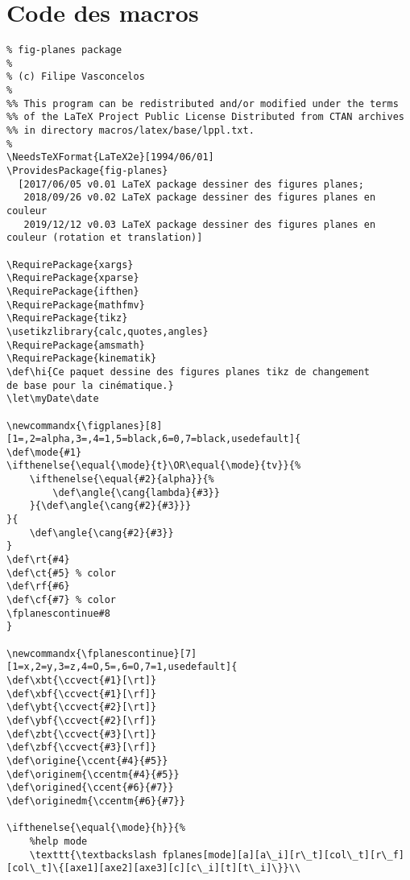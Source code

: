 \documentclass[a4paper,9pt]{article}
\begin{document}
\section{Code des macros}
\footnotesize
\begin{verbatim}
% fig-planes package
% 
% (c) Filipe Vasconcelos
%
%% This program can be redistributed and/or modified under the terms
%% of the LaTeX Project Public License Distributed from CTAN archives
%% in directory macros/latex/base/lppl.txt.
% 
\NeedsTeXFormat{LaTeX2e}[1994/06/01]
\ProvidesPackage{fig-planes}
  [2017/06/05 v0.01 LaTeX package dessiner des figures planes;
   2018/09/26 v0.02 LaTeX package dessiner des figures planes en couleur
   2019/12/12 v0.03 LaTeX package dessiner des figures planes en couleur (rotation et translation)]

\RequirePackage{xargs}
\RequirePackage{xparse}
\RequirePackage{ifthen}
\RequirePackage{mathfmv}
\RequirePackage{tikz}
\usetikzlibrary{calc,quotes,angles}
\RequirePackage{amsmath}
\RequirePackage{kinematik}
\def\hi{Ce paquet dessine des figures planes tikz de changement 
de base pour la cinématique.}
\let\myDate\date

\newcommandx{\figplanes}[8][1=,2=alpha,3=,4=1,5=black,6=0,7=black,usedefault]{ 
\def\mode{#1}
\ifthenelse{\equal{\mode}{t}\OR\equal{\mode}{tv}}{%
    \ifthenelse{\equal{#2}{alpha}}{%
        \def\angle{\cang{lambda}{#3}}
    }{\def\angle{\cang{#2}{#3}}}
}{
    \def\angle{\cang{#2}{#3}}
}
\def\rt{#4}
\def\ct{#5} % color
\def\rf{#6}
\def\cf{#7} % color
\fplanescontinue#8
}

\newcommandx{\fplanescontinue}[7][1=x,2=y,3=z,4=O,5=,6=O,7=1,usedefault]{ 
\def\xbt{\ccvect{#1}[\rt]}
\def\xbf{\ccvect{#1}[\rf]}
\def\ybt{\ccvect{#2}[\rt]}
\def\ybf{\ccvect{#2}[\rf]}
\def\zbt{\ccvect{#3}[\rt]}
\def\zbf{\ccvect{#3}[\rf]}
\def\origine{\ccent{#4}{#5}}
\def\originem{\ccentm{#4}{#5}}
\def\origined{\ccent{#6}{#7}}
\def\originedm{\ccentm{#6}{#7}}

\ifthenelse{\equal{\mode}{h}}{%
    %help mode
    \texttt{\textbackslash fplanes[mode][a][a\_i][r\_t][col\_t][r\_f][col\_t]\{[axe1][axe2][axe3][c][c\_i][t][t\_i]\}}\\


\end{verbatim}
\end{document}
